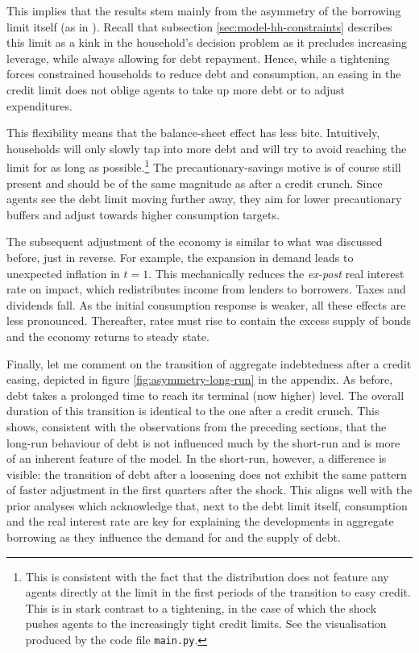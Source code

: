\documentclass[a4paper,12pt]{article} %
\numberwithin{equation}{section} %
\numberwithin{figure}{section}
\numberwithin{table}{section}
\begin{document}
This implies that the results stem mainly from the asymmetry of the borrowing limit itself (as in \cite{guerrieri2017asym}). Recall that subsection \ref{sec:model-hh-constraints} describes this limit as a kink in the household's decision problem as it precludes increasing leverage, while always allowing for debt repayment. Hence, while a tightening forces constrained households to reduce debt and consumption, an easing in the credit limit does not oblige agents to take up more debt or to adjust expenditures.

This flexibility means that the balance-sheet effect has less bite. Intuitively, households will only slowly tap into more debt and will try to avoid reaching the limit for as long as possible.\footnote{This is consistent with the fact that the distribution does not feature any agents directly at the limit in the first periods of the transition to easy credit. This is in stark contrast to a tightening, in the case of which the shock pushes agents to the increasingly tight credit limits. See the visualisation produced by the code file \texttt{main.py}.} The precautionary-savings motive is of course still present and should be of the same magnitude as after a credit crunch. Since agents see the debt limit moving further away, they aim for lower precautionary buffers and adjust towards higher consumption targets. 

The subsequent adjustment of the economy is similar to what was discussed before, just in reverse. For example, the expansion in demand leads to unexpected inflation in $t=1$. This mechanically reduces the \textit{ex-post} real interest rate on impact, which redistributes income from lenders to borrowers. Taxes and dividends fall. As the initial consumption response is weaker, all these effects are less pronounced. Thereafter, rates must rise to contain the excess supply of bonds and the economy returns to steady state.

Finally, let me comment on the transition of aggregate indebtedness after a credit easing, depicted in figure \ref{fig:asymmetry-long-run} in the appendix. As before, debt takes a prolonged time to reach its terminal (now higher) level. The overall duration of this transition is identical to the one after a credit crunch. This shows, consistent with the observations from the preceding sections, that the long-run behaviour of debt is not influenced much by the short-run and is more of an inherent feature of the model. In the short-run, however, a difference is visible: the transition of debt after a loosening does not exhibit the same pattern of faster adjustment in the first quarters after the shock. This aligns well with the prior analyses which acknowledge that, next to the debt limit itself, consumption and the real interest rate are key for explaining the developments in aggregate borrowing as they influence the demand for and the supply of debt.
\end{document}
